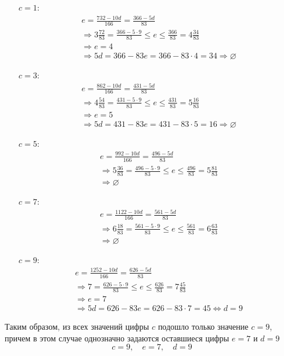 \documentclass[12pt]{article}
\begin{document}
    \begin{itemize}
        \item[$c = 1$:]
            \begin{gather*}
                e = \frac{732 - 10d}{166} = \frac{366 - 5d}{83} \\
                \Longrightarrow 3\frac{72}{83} = \frac{366 - 5\cdot9}{83} \leqslant e \leqslant \frac{366}{83} = 4\frac{34}{83} \\
                \Longrightarrow e = 4 \\
                \Longrightarrow 5d = 366 - 83e = 366 - 83\cdot4 = 34 \Rightarrow \varnothing
            \end{gather*}
        \item[$c = 3$:]
            \begin{gather*}
                e = \frac{862 - 10d}{166} = \frac{431 - 5d}{83} \\
                \Longrightarrow 4\frac{54}{83} = \frac{431 - 5\cdot9}{83} \leqslant e \leqslant \frac{431}{83} = 5\frac{16}{83} \\
                \Longrightarrow e = 5 \\
                \Longrightarrow 5d = 431 - 83e = 431 - 83\cdot5 = 16 \Rightarrow \varnothing
            \end{gather*}
        \item[$c = 5$:]
            \begin{gather*}
                e = \frac{992 - 10d}{166} = \frac{496 - 5d}{83} \\
                \Longrightarrow 5\frac{36}{83} = \frac{496 - 5\cdot9}{83} \leqslant e \leqslant \frac{496}{83} = 5\frac{81}{83} \\
                \Longrightarrow \varnothing
            \end{gather*}
        \item[$c = 7$:]
            \begin{gather*}
                e = \frac{1122 - 10d}{166} = \frac{561 - 5d}{83} \\
                \Longrightarrow 6\frac{18}{83} = \frac{561 - 5\cdot9}{83} \leqslant e \leqslant \frac{561}{83} = 6\frac{63}{83} \\
                \Longrightarrow \varnothing
            \end{gather*}
        \item[$c = 9$:]
            \begin{gather*}
                e = \frac{1252 - 10d}{166} = \frac{626 - 5d}{83} \\
                \Longrightarrow 7 = \frac{626 - 5\cdot9}{83} \leqslant e \leqslant \frac{626}{83} = 7\frac{45}{83} \\
                \Longrightarrow e = 7 \\
                \Longrightarrow 5d = 626 - 83e = 626 - 83\cdot7 = 45 \Leftrightarrow d = 9
            \end{gather*}
    \end{itemize}
    Таким образом, из всех значений цифры $c$ подошло только значение $c = 9$, причем в этом случае однозначно задаются оставшиеся цифры $e = 7$ и $d = 9$
    $$
        \boxed{c = 9,\quad e = 7,\quad d = 9}
    $$
\end{document}
